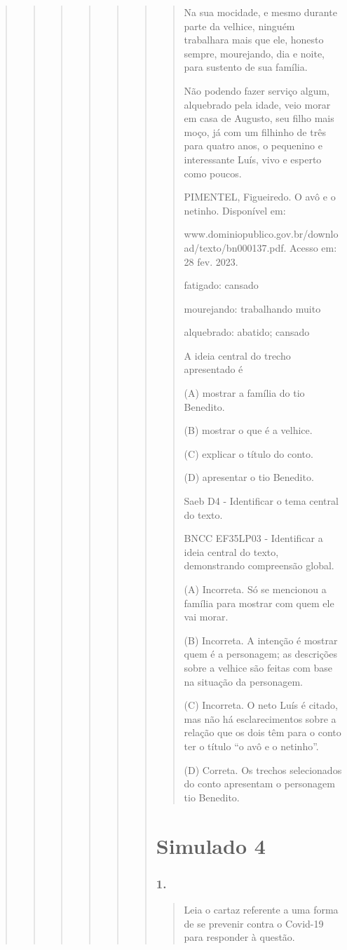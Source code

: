 \begin{quote}
\begin{quote}
\begin{quote}
\begin{quote}
\begin{quote}
\begin{quote}
\begin{quote}
Na sua mocidade, e mesmo durante parte da velhice, ninguém trabalhara
mais que ele, honesto sempre, mourejando, dia e noite, para sustento de
sua família.

Não podendo fazer serviço algum, alquebrado pela idade, veio morar em
casa de Augusto, seu filho mais moço, já com um filhinho de três para
quatro anos, o pequenino e interessante Luís, vivo e esperto como
poucos.

PIMENTEL, Figueiredo. O avô e o netinho. Disponível em:

www.dominiopublico.gov.br/download/texto/bn000137.pdf. Acesso em: 28
fev. 2023.

fatigado: cansado

mourejando: trabalhando muito

alquebrado: abatido; cansado

A ideia central do trecho apresentado é

(A) mostrar a família do tio Benedito.

(B) mostrar o que é a velhice.

(C) explicar o título do conto.

(D) apresentar o tio Benedito.

Saeb D4 - Identificar o tema central do texto.

BNCC EF35LP03 - Identificar a ideia central do texto, demonstrando
compreensão global.

(A) Incorreta. Só se mencionou a família para mostrar com quem ele vai
morar.

(B) Incorreta. A intenção é mostrar quem é a personagem; as descrições
sobre a velhice são feitas com base na situação da personagem.

(C) Incorreta. O neto Luís é citado, mas não há esclarecimentos sobre a
relação que os dois têm para o conto ter o título ``o avô e o netinho''.

(D) Correta. Os trechos selecionados do conto apresentam o personagem
tio Benedito.
\end{quote}

\section{Simulado 4}\label{simulado-4}

\subsubsection{1. }\label{section-91}

\begin{quote}
Leia o cartaz referente a uma forma de se prevenir contra o Covid-19
para responder à questão.


\end{quote}
\end{quote}
\end{quote}
\end{quote}
\end{quote}
\end{quote}
\end{quote}
